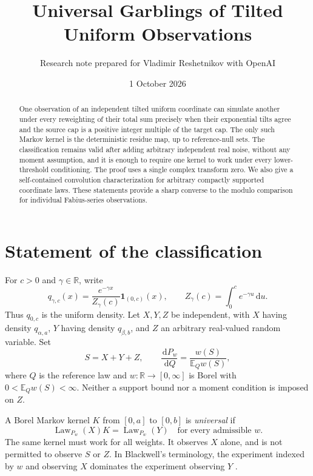 \documentclass[11pt,a4paper]{article}
\title{Universal Garblings of Tilted Uniform Observations}
\author{Research note prepared for Vladimir Reshetnikov with OpenAI}
\date{1 October 2026}
\theoremstyle{remark}\newtheorem*{ednote}{Editorial note (ProveIt, 2026-10-01)}
\newcommand{\E}{\mathbb E}\newcommand{\R}{\mathbb R}\newcommand{\C}{\mathbb C}\newcommand{\N}{\mathbb N}
\newcommand{\Law}{\operatorname{Law}}\newcommand{\ind}{\mathbf1}
\newcommand{\dd}{\,\mathrm d}\newcommand{\ii}{\mathrm i}
\begin{document}
\maketitle
\begin{abstract}
One observation of an independent tilted uniform coordinate can simulate another under every reweighting of their total sum precisely when their exponential tilts agree and the source cap is a positive integer multiple of the target cap. The only such Markov kernel is the deterministic residue map, up to reference-null sets. The classification remains valid after adding arbitrary independent real noise, without any moment assumption, and it is enough to require one kernel to work under every lower-threshold conditioning. The proof uses a single complex transform zero. We also give a self-contained convolution characterization for arbitrary compactly supported coordinate laws. These statements provide a sharp converse to the modulo comparison for individual Fabius-series observations.
\end{abstract}

\section{Statement of the classification}
For $c>0$ and $\gamma\in\R$, write
\begin{equation}\label{eq:density}
 q_{\gamma,c}(x)=\frac{e^{-\gamma x}}{Z_\gamma(c)}\ind_{(0,c)}(x),
 \qquad Z_\gamma(c)=\int_0^c e^{-\gamma u}\dd u.
\end{equation}
Thus $q_{0,c}$ is the uniform density. Let $X,Y,Z$ be independent, with $X$ having density $q_{\alpha,a}$, $Y$ having density $q_{\beta,b}$, and $Z$ an arbitrary real-valued random variable. Set
\[
 S=X+Y+Z,
 \qquad \frac{\dd P_w}{\dd Q}=\frac{w(S)}{\E_Qw(S)},
\]
where $Q$ is the reference law and $w:\R\to[0,\infty]$ is Borel with $0<\E_Qw(S)<\infty$. Neither a support bound nor a moment condition is imposed on $Z$.

A Borel Markov kernel $K$ from $[0,a]$ to $[0,b]$ is \emph{universal} if
\begin{equation}\label{eq:universal}
 \Law_{P_w}(X)K=\Law_{P_w}(Y)
 \quad\text{for every admissible }w.
\end{equation}
The same kernel must work for all weights. It observes $X$ alone, and is not permitted to observe $S$ or $Z$. In Blackwell's terminology, the experiment indexed by $w$ and observing $X$ dominates the experiment observing $Y$ \cite{Blackwell}.
\end{document}
